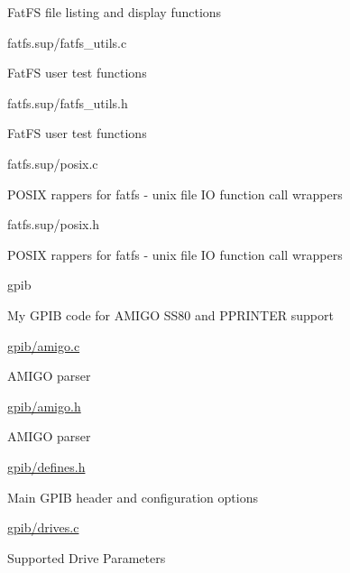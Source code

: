 \begin{DoxyItemize}
\begin{DoxyItemize}
\begin{DoxyItemize}
\item Fat\+FS file listing and display functions
\end{DoxyItemize}
\item fatfs.\+sup/fatfs\+\_\+utils.c
\begin{DoxyItemize}
\item Fat\+FS user test functions
\end{DoxyItemize}
\item fatfs.\+sup/fatfs\+\_\+utils.h
\begin{DoxyItemize}
\item Fat\+FS user test functions
\end{DoxyItemize}
\item fatfs.\+sup/posix.c
\begin{DoxyItemize}
\item P\+O\+S\+IX rappers for fatfs -\/ unix file IO function call wrappers
\end{DoxyItemize}
\item fatfs.\+sup/posix.h
\begin{DoxyItemize}
\item P\+O\+S\+IX rappers for fatfs -\/ unix file IO function call wrappers
\end{DoxyItemize}
\end{DoxyItemize}
\item gpib
\begin{DoxyItemize}
\item My G\+P\+IB code for A\+M\+I\+GO S\+S80 and P\+P\+R\+I\+N\+T\+ER support
\item \hyperlink{amigo_8c}{gpib/amigo.\+c}
\begin{DoxyItemize}
\item A\+M\+I\+GO parser
\end{DoxyItemize}
\item \hyperlink{amigo_8h}{gpib/amigo.\+h}
\begin{DoxyItemize}
\item A\+M\+I\+GO parser
\end{DoxyItemize}
\item \hyperlink{defines_8h}{gpib/defines.\+h}
\begin{DoxyItemize}
\item Main G\+P\+IB header and configuration options
\end{DoxyItemize}
\item \hyperlink{drives_8c}{gpib/drives.\+c}
\begin{DoxyItemize}
\item Supported Drive Parameters

\end{DoxyItemize}
\end{DoxyItemize}
\end{DoxyItemize}
